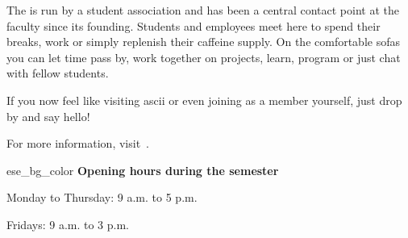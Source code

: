 The \ascii{} is run by a student association and has been a central contact point at the faculty since its founding. Students and employees meet here to spend their breaks, work or simply replenish their caffeine supply. On the comfortable sofas you can let time pass by, work together on projects, learn, program or just chat with fellow students.

If you now feel like visiting ascii or even joining as a member yourself, just drop by and say hello!

For more information, visit~.

\begin{awesomeblock}{2pt}{\faCalendar*[regular]}{ese_bg_color}
    \textbf{Opening hours during the semester}

    Monday to Thursday: 9 a.m. to 5 p.m.

    Fridays: 9 a.m. to 3 p.m.
\end{awesomeblock}
